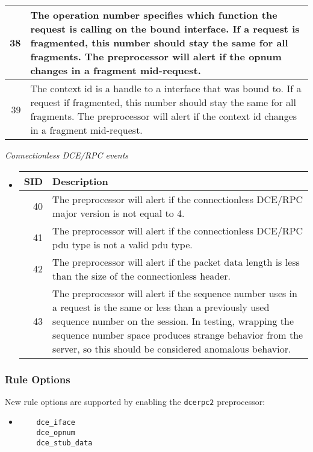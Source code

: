 \documentclass[english]{report}
\begin{document}
\begin{itemize}
\begin{longtable}[h]{|r|p{13.5cm}|}
\hline
 38 & The operation number specifies which function the request is calling on
      the bound interface. If a request is fragmented, this number should stay
      the same for all fragments.  The preprocessor will alert if the opnum
      changes in a fragment mid-request.\\
\hline
 39 & The context id is a handle to a interface that was bound to. If a
      request if fragmented, this number should stay the same for all
      fragments. The preprocessor will alert if the context id changes in a
      fragment mid-request.\\
\hline
\end{longtable}
\end{itemize}

\textit{Connectionless DCE/RPC events}
\begin{itemize}
\item[]
\begin{longtable}{|r|p{13.5cm}|}
\hline
SID & Description\\
\hline
\hline
 40 & The preprocessor will alert if the connectionless DCE/RPC major version
      is not equal to 4.\\
\hline
 41 & The preprocessor will alert if the connectionless DCE/RPC pdu type is
      not a valid pdu type.\\
\hline
 42 & The preprocessor will alert if the packet data length is less than the
      size of the connectionless header.\\
\hline
 43 & The preprocessor will alert if the sequence number uses in a request is
      the same or less than a previously used sequence number on the session.
      In testing, wrapping the sequence number space produces strange behavior
      from the server, so this should be considered anomalous behavior.\\
\hline
\end{longtable}
\end{itemize}

\subsubsection{Rule Options}

New rule options are supported by enabling the \texttt{dcerpc2} preprocessor:

\begin{itemize}
\item[]
\begin{verbatim}
    dce_iface
    dce_opnum
    dce_stub_data
\end{verbatim}
\end{itemize}
\end{document}
